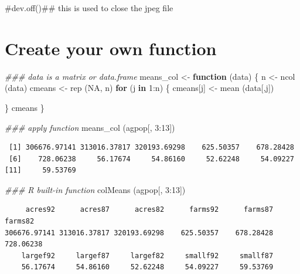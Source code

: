 \documentclass[
  letterpaper,
]{scrbook}
\newenvironment{Shaded}{\begin{snugshade}}{\end{snugshade}}
\newcommand{\CommentTok}[1]{\textcolor[rgb]{0.37,0.37,0.37}{#1}}
\newcommand{\ConstantTok}[1]{\textcolor[rgb]{0.56,0.35,0.01}{#1}}
\newcommand{\ControlFlowTok}[1]{\textcolor[rgb]{0.00,0.23,0.31}{\textbf{#1}}}
\newcommand{\DecValTok}[1]{\textcolor[rgb]{0.68,0.00,0.00}{#1}}
\newcommand{\DocumentationTok}[1]{\textcolor[rgb]{0.37,0.37,0.37}{\textit{#1}}}
\newcommand{\FunctionTok}[1]{\textcolor[rgb]{0.28,0.35,0.67}{#1}}
\newcommand{\NormalTok}[1]{\textcolor[rgb]{0.00,0.23,0.31}{#1}}
\newcommand{\OtherTok}[1]{\textcolor[rgb]{0.00,0.23,0.31}{#1}}
\newcommand{\SpecialCharTok}[1]{\textcolor[rgb]{0.37,0.37,0.37}{#1}}
\begin{document}
\begin{Shaded}
\begin{Highlighting}[]
\CommentTok{\#dev.off()\#\# this is used to close the jpeg file}
\end{Highlighting}
\end{Shaded}

\section{Create your own function}\label{create-your-own-function}

\begin{Shaded}
\begin{Highlighting}[]
\DocumentationTok{\#\#\# data is a matrix or data.frame}
\NormalTok{means\_col }\OtherTok{\textless{}{-}} \ControlFlowTok{function}\NormalTok{ (data)}
\NormalTok{\{}
\NormalTok{    n }\OtherTok{\textless{}{-}} \FunctionTok{ncol}\NormalTok{ (data)}
\NormalTok{    cmeans }\OtherTok{\textless{}{-}} \FunctionTok{rep}\NormalTok{ (}\ConstantTok{NA}\NormalTok{, n)}
    \ControlFlowTok{for}\NormalTok{ (j }\ControlFlowTok{in} \DecValTok{1}\SpecialCharTok{:}\NormalTok{n)}
\NormalTok{    \{}
\NormalTok{        cmeans[j] }\OtherTok{\textless{}{-}} \FunctionTok{mean}\NormalTok{ (data[,j])}
        
\NormalTok{    \}}
\NormalTok{    cmeans}
\NormalTok{\}}

\DocumentationTok{\#\#\# apply function}
\FunctionTok{means\_col}\NormalTok{ (agpop[, }\DecValTok{3}\SpecialCharTok{:}\DecValTok{13}\NormalTok{])}
\end{Highlighting}
\end{Shaded}

\begin{verbatim}
 [1] 306676.97141 313016.37817 320193.69298    625.50357    678.28428
 [6]    728.06238     56.17674     54.86160     52.62248     54.09227
[11]     59.53769
\end{verbatim}

\begin{Shaded}
\begin{Highlighting}[]
\DocumentationTok{\#\#\# R built{-}in function}
\FunctionTok{colMeans}\NormalTok{ (agpop[, }\DecValTok{3}\SpecialCharTok{:}\DecValTok{13}\NormalTok{])}
\end{Highlighting}
\end{Shaded}

\begin{verbatim}
     acres92      acres87      acres82      farms92      farms87      farms82 
306676.97141 313016.37817 320193.69298    625.50357    678.28428    728.06238 
    largef92     largef87     largef82     smallf92     smallf87 
    56.17674     54.86160     52.62248     54.09227     59.53769 
\end{verbatim}
\end{document}
